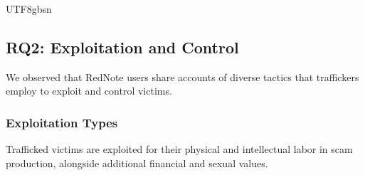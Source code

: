 \documentclass[sigconf,nonacm]{acmart}
\begin{document}
\begin{CJK}{UTF8}{gbsn}
\subsection{RQ2: Exploitation and Control}
\label{sec:RQ2}

We observed that RedNote users share accounts of diverse tactics that traffickers employ to exploit and control victims. 

\subsubsection{Exploitation Types}
\label{sec:exploitation_types} 

Trafficked victims are exploited for their physical and intellectual labor in scam production, alongside additional financial and sexual values.


\end{CJK}
\end{document}

